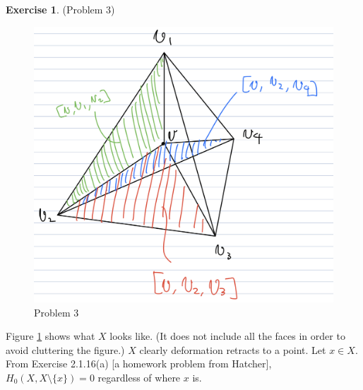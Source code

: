 \documentclass[12pt, psamsfonts]{amsart}
\theoremstyle{definition}
\newtheorem*{exer}{Exercise}
\theoremstyle{remark}
\numberwithin{equation}{section}
\begin{document}
\begin{exer}{(Problem 3)}
  \begin{figure}[!htb]
    \includegraphics[width=.5\linewidth]{problem3.jpeg}
    \caption{Problem 3}
    \label{fig:problem3}
  \end{figure}
  Figure \ref{fig:problem3} shows what $X$ looks like.
  (It does not include all the faces in order to avoid cluttering the figure.)
  $X$ clearly deformation retracts to a point.
  Let $x \in X$.
  From Exercise 2.1.16(a) [a homework problem from Hatcher], $H_0(X, X \setminus \{ x \}) = 0$ regardless of where $x$ is.


\end{exer}
\end{document}
